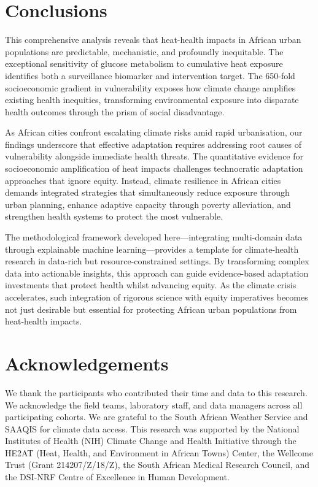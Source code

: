 \documentclass[11pt,a4paper]{article}
\begin{document}
\section{Conclusions}

This comprehensive analysis reveals that heat-health impacts in African urban populations are predictable, mechanistic, and profoundly inequitable. The exceptional sensitivity of glucose metabolism to cumulative heat exposure identifies both a surveillance biomarker and intervention target. The 650-fold socioeconomic gradient in vulnerability exposes how climate change amplifies existing health inequities, transforming environmental exposure into disparate health outcomes through the prism of social disadvantage.

As African cities confront escalating climate risks amid rapid urbanisation, our findings underscore that effective adaptation requires addressing root causes of vulnerability alongside immediate health threats. The quantitative evidence for socioeconomic amplification of heat impacts challenges technocratic adaptation approaches that ignore equity. Instead, climate resilience in African cities demands integrated strategies that simultaneously reduce exposure through urban planning, enhance adaptive capacity through poverty alleviation, and strengthen health systems to protect the most vulnerable.

The methodological framework developed here---integrating multi-domain data through explainable machine learning---provides a template for climate-health research in data-rich but resource-constrained settings. By transforming complex data into actionable insights, this approach can guide evidence-based adaptation investments that protect health whilst advancing equity. As the climate crisis accelerates, such integration of rigorous science with equity imperatives becomes not just desirable but essential for protecting African urban populations from heat-health impacts.

\section*{Acknowledgements}

We thank the participants who contributed their time and data to this research. We acknowledge the field teams, laboratory staff, and data managers across all participating cohorts. We are grateful to the South African Weather Service and SAAQIS for climate data access. This research was supported by the National Institutes of Health (NIH) Climate Change and Health Initiative through the HE2AT (Heat, Health, and Environment in African Towns) Center, the Wellcome Trust (Grant 214207/Z/18/Z), the South African Medical Research Council, and the DSI-NRF Centre of Excellence in Human Development.
\end{document}
